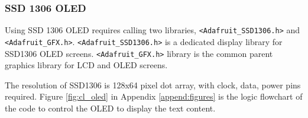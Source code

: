 \subsubsection{SSD 1306 OLED}
Using SSD 1306 OLED requires calling two libraries, \lstinline{<Adafruit_SSD1306.h>} and 
\lstinline{<Adafruit_GFX.h>}. \lstinline{<Adafruit_SSD1306.h>} is a dedicated display library for SSD1306 OLED 
screens. \lstinline{<Adafruit_GFX.h>} library is the common parent graphics library for LCD and OLED screens. 

The resolution of SSD1306 is 128x64 pixel dot array, with clock, data, power pins required. Figure \ref{fig:cl_oled} in 
Appendix \ref{append:figures} is the logic flowchart of the code to control the OLED to display the text content. 
\newpage

\newpage 